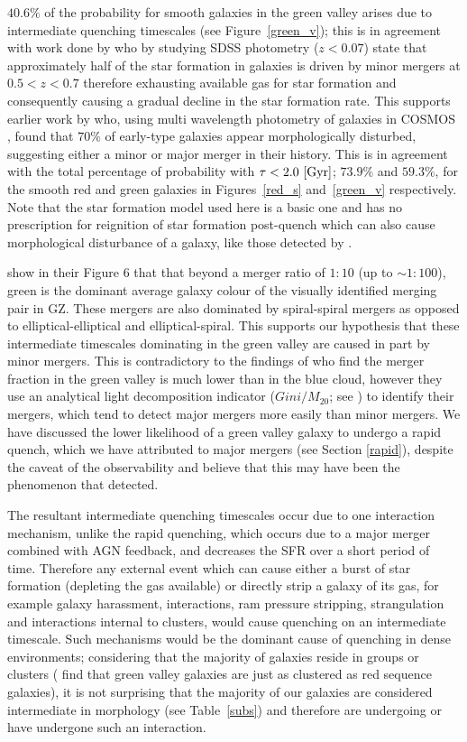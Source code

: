 $40.6\%$ of the probability for smooth galaxies in the green valley arises due to intermediate quenching timescales (see Figure~\ref{green_v}); this is in agreement with work done by \citet{kaviraj14a, kaviraj14b} who by studying SDSS photometry ($z<0.07$) state that approximately half of the star formation in galaxies is driven by minor mergers at $0.5 < z < 0.7$ therefore exhausting available gas for star formation and consequently causing a gradual decline in the star formation rate. This supports earlier work by \cite{kaviraj11} who, using multi wavelength photometry of galaxies in COSMOS \citep{Scoville07}, found that $70\%$ of early-type galaxies appear morphologically disturbed, suggesting either a minor or major merger in their history. This is in agreement with the total percentage of probability with $\tau < 2.0 ~\rm[Gyr]$; $73.9\%$ and $59.3\%$, for the smooth red and green galaxies in Figures~\ref{red_s} and~\ref{green_v} respectively. Note that the star formation model used here is a basic one and has no prescription for reignition of star formation post-quench which can also cause morphological disturbance of a galaxy, like those detected by \cite{kaviraj11}.

\citet{Darg10a} show in their Figure 6 that that beyond a merger ratio of $1:10$ (up to $\sim 1:100$), green is the dominant average galaxy colour of the visually identified merging pair in GZ. These mergers are also dominated by spiral-spiral mergers as opposed to elliptical-elliptical and elliptical-spiral. This supports our hypothesis that these intermediate timescales dominating in the green valley are caused in part by minor mergers. This is contradictory to the findings of \citet{Mendez11} who find the merger fraction in the green valley is much lower than in the blue cloud, however they use an analytical light decomposition indicator ($Gini/M_{20}$; see \citealt{lotz08b}) to identify their mergers, which tend to detect major mergers more easily than minor mergers. We have discussed the lower likelihood of a green valley galaxy to undergo a rapid quench, which we have attributed to major mergers (see Section \ref{rapid}), despite the caveat of the observability and believe that this may have been the phenomenon that \citet{Mendez11} detected.

The resultant intermediate quenching timescales occur due to one interaction mechanism, unlike the rapid quenching, which occurs due to a major merger combined with AGN feedback, and decreases the SFR over a short period of time. Therefore any external event which can cause either a burst of star formation (depleting the gas available) or directly strip a galaxy of its gas, for example galaxy harassment, interactions, ram pressure stripping, strangulation and interactions internal to clusters, would cause quenching on an intermediate timescale. Such mechanisms would be the dominant cause of quenching in dense environments; considering that the majority of galaxies reside in groups or clusters (\citealt{Coil08} find that green valley galaxies are just as clustered as red sequence galaxies), it is not surprising that the majority of our galaxies are considered intermediate in morphology (see Table~\ref{subs}) and therefore are undergoing or have undergone such an interaction.


